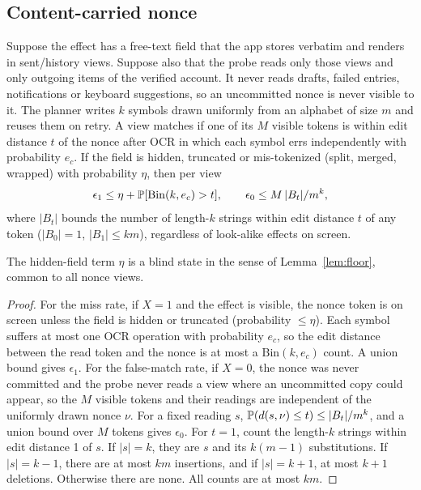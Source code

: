 \subsection{Content-carried nonce}
\begin{lemma}
\label{lem:nonce}
Suppose the effect has a free-text field that the app stores verbatim and renders in sent/history views. Suppose also that the probe reads only those views and only
outgoing items of the verified account. It never reads drafts, failed entries, notifications or keyboard suggestions, so an uncommitted nonce is never visible to it. The planner writes $k$ symbols
drawn uniformly from an alphabet of size $m$ and reuses them on retry. A view matches if one of its $M$ visible tokens is within edit distance $t$ of the nonce after OCR in which
each symbol errs independently with probability $e_c$. If the field is hidden, truncated or mis-tokenized (split, merged, wrapped) with probability $\eta$, then per view
\begin{equation}
\epsilon_1\le\eta+\mathbb{P}[\mathrm{Bin}(k,e_c)>t],\qquad \epsilon_0\le M\,|B_t|/m^k,
\label{eq:nonce}
\end{equation}
where $|B_t|$ bounds the number of length-$k$ strings within edit distance $t$ of any token ($|B_0|=1$, $|B_1|\le km$), regardless of look-alike effects on screen.
\end{lemma}
The hidden-field term $\eta$ is a blind state in the sense of Lemma~\ref{lem:floor}, common to all nonce views.

\begin{proof}
For the miss rate, if $X{=}1$ and the effect is visible, the nonce token is on screen unless the field is hidden or truncated (probability $\le\eta$). Each symbol suffers at most one OCR
operation with probability $e_c$, so the edit distance between the read token and the nonce is at most a $\mathrm{Bin}(k,e_c)$ count. A union bound gives $\epsilon_1$.
For the false-match rate, if $X{=}0$, the nonce was never committed and the probe never reads a view where an uncommitted copy could appear, so the $M$ visible tokens and their readings are
independent of the uniformly drawn nonce $\nu$. For a fixed reading $s$, $\mathbb{P}(d(s,\nu)\le t)\le|B_t|/m^k$, and a union bound over $M$ tokens gives $\epsilon_0$. For $t{=}1$, count the
length-$k$ strings within edit distance 1 of $s$. If $|s|=k$, they are $s$ and its $k(m-1)$ substitutions. If $|s|=k-1$, there are at most $km$ insertions, and if $|s|=k+1$,
at most $k+1$ deletions. Otherwise there are none. All counts are at most $km$.
\end{proof}


